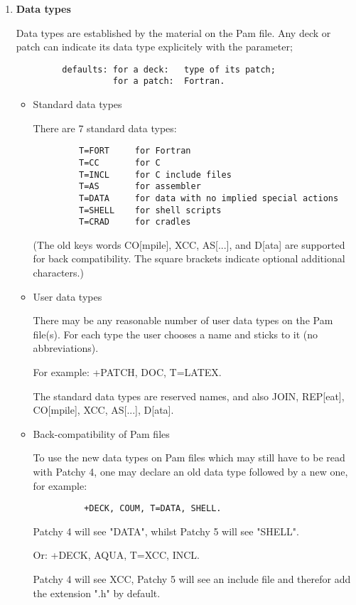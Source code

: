 \begin{enumerate}
\item {\bf Data types}%

Data types are established by the material on the Pam file.
Any deck or patch can indicate its data type explicitely
with the  parameter;
\begin{verbatim}
         defaults: for a deck:   type of its patch;
                   for a patch:  Fortran.
\end{verbatim}

\begin{itemize}
\item[]   Standard data types

   There are 7 standard data types:
\begin{verbatim}
         T=FORT     for Fortran
         T=CC       for C
         T=INCL     for C include files
         T=AS       for assembler
         T=DATA     for data with no implied special actions
         T=SHELL    for shell scripts
         T=CRAD     for cradles
\end{verbatim}
     (The old keys words CO[mpile], XCC, AS[...], and D[ata] are
      supported for back compatibility. The square brackets indicate
      optional additional characters.)
\item[]    User data types

   There may be any reasonable number of user data types on the Pam file(s).
   For each type the user chooses a name and sticks to it (no abbreviations).

   For example:  +PATCH, DOC, T=LATEX.

   The standard data types are reserved names, and also JOIN, REP[eat],
   CO[mpile], XCC, AS[...], D[ata].

\item[]    Back-compatibility of Pam files

   To use the new data types on Pam files which may still have to be read
   with Patchy 4, one may declare an old data type followed by a new one,
   for example:
\begin{verbatim}
          +DECK, COUM, T=DATA, SHELL.
\end{verbatim}
   Patchy 4 will see "DATA", whilst Patchy 5 will see "SHELL".

   Or:
          +DECK, AQUA, T=XCC, INCL.

   Patchy 4 will see XCC, Patchy 5 will see an include file and therefor
   add the extension ".h" by default.


\end{itemize}
\end{enumerate}
